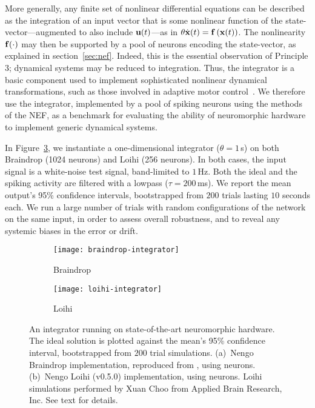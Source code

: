 More generally, any finite set of nonlinear differential equations can be described as the integration of an input vector that is some nonlinear function of the state-vector---augmented to also include $\mathbf{u}(t)$---as in $\theta \dot{\mathbf{x}}(t) = \mathbf{f}\left({\mathbf{x}(t)}\right)$.
The nonlinearity $\mathbf{f}(\cdot)$ may then be supported by a pool of neurons encoding the state-vector, as explained in section~\ref{sec:nef}.
Indeed, this is the essential observation of Principle 3; dynamical systems may be reduced to integration.
Thus, the integrator is a basic component used to implement sophisticated nonlinear dynamical transformations, such as those involved in adaptive motor control~\citep{dewolf2016}.
We therefore use the integrator, implemented by a pool of spiking neurons using the methods of the NEF, as a benchmark for evaluating the ability of neuromorphic hardware to implement generic dynamical systems.

In Figure~\ref{fig:integrator-neuromorphic}, we instantiate a one-dimensional integrator ($\theta = 1$\,s) on both Braindrop (1024 neurons) and Loihi (256 neurons).
In both cases, the input signal is a white-noise test signal, band-limited to $1$\,Hz.
Both the ideal and the spiking activity are filtered with a lowpass ($\tau = 200$\,ms).
We report the mean output's 95\% confidence intervals, bootstrapped from $200$ trials lasting $10$ seconds each.
We run a large number of trials with random configurations of the network on the same input, in order to assess overall robustness, and to reveal any systemic biases in the error or drift.

\begin{figure}
  \centering
  \begin{subfigure}{.5\textwidth}
    \centering
    \texttt{[image: braindrop-integrator]}
    \caption{Braindrop}
    \label{fig:braindrop-integrator}
  \end{subfigure}%
  \begin{subfigure}{.5\textwidth}
    \centering
    \texttt{[image: loihi-integrator]}
    \caption{Loihi}
    \label{fig:loihi-integrator}
  \end{subfigure}
  \caption[Dynamical integration on Braindrop and Loihi.]{
    An integrator running on state-of-the-art neuromorphic hardware.
    The ideal solution is plotted against the mean's 95\% confidence interval, bootstrapped from $200$ trial simulations.
    (a)~Nengo Braindrop implementation, reproduced from \citet[][Figure~15]{braindrop2019}, using  neurons. 
    (b)~Nengo Loihi (v0.5.0) implementation, using  neurons.
    Loihi simulations performed by Xuan Choo from Applied Brain Research, Inc.
    See text for details.
  }\label{fig:integrator-neuromorphic}
\end{figure}

